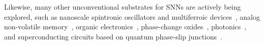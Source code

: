 Likewise, many other unconventional substrates for SNNs are actively being explored, such as nanoscale spintronic oscillators and multiferroic devices~\citep{torrejon2017neuromorphic, hoppensteadt2017applied, manipatruni2018beyond}, analog non-volatile memory~\citep{ambrogio2018equivalent}, organic electronics~\citep{van2018organic}, phase-change oxides~\citep{zhao2019low}, photonics~\citep{tait2018silicon, shainline2018largest}, and superconducting circuits based on quantum phase-slip junctions~\citep[QPSJs;][]{cheng2019superconducting}.

